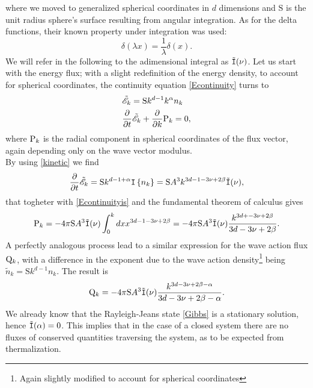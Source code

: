 where we moved to generalized spherical coordinates in $d$ dimensions and $\mathrm{S}$  is the unit radius sphere's surface
resulting from angular integration. 
As for the delta functions, their known property under integration was used:
\begin{equation*}
    \delta(\lambda x) = \frac{1}{\lambda} \delta (x).
\end{equation*}
We will refer in the following to the adimensional integral as $\tilde{\mathtt{I}}(\nu)$. 
Let us start with the energy flux; with a slight redefinition of the energy density,
to account for spherical coordinates, the continuity equation \eqref{Econtinuity} turns to 
\begin{align}
    &\tilde{\mathscr{E}}_k = \mathrm{S}k^{d-1}k^\alpha n_k \\
    &\frac{\partial}{\partial t} \tilde{\mathscr{E}}_k + \frac{\partial}{\partial k}  \mathrm{P}_k = 0,
    \label{Econtinuityis}
\end{align}
where $\mathrm{P}_k$ is the radial component in spherical coordinates of the flux vector,
again depending only on the wave vector modulus.\\
By using \eqref{kinetic} we find
\begin{equation}
    \frac{\partial}{\partial t} \tilde{\mathscr{E}}_k = \mathrm{S} k^{d-1+\alpha} \mathtt{I}\left\{n_k\right\}= \mathrm{S} A^3 k^{3d-1-3\nu +2\beta} \tilde{\mathtt{I}}(\nu),
\end{equation}
that togheter with \eqref{Econtinuityis} and the fundamental theorem of calculus gives 
\begin{equation}
    \mathrm{P}_k = - 4\pi \mathrm{S} A^3 \tilde{\mathtt{I}}(\nu) \int_{0}^{k} dx x^{3d-1-3\nu +2\beta} = - 4\pi \mathrm{S} A^3 \tilde{\mathtt{I}}(\nu) 
    \frac{k^{3d+-3\nu +2\beta}}{3d-3\nu +2\beta}.
    \label{KZP}
\end{equation} 
A perfectly analogous process lead to a similar expression for the wave action flux $\mathrm{Q}_k$, with a difference in the exponent due to the wave action 
density\footnote{Again slightly modified to account for spherical coordinates} being $\tilde{n}_k=\mathrm{S}k^{d-1}n_k$. The result is
\begin{equation}
    \mathrm{Q}_k = - 4\pi \mathrm{S} A^3 \tilde{\mathtt{I}}(\nu) \frac{k^{3d-3\nu +2\beta-\alpha}}{3d-3\nu +2\beta-\alpha}.
    \label{KZQ}
\end{equation}
We already know that the Rayleigh-Jeans state \eqref{Gibbs} is a stationary solution, hence $\tilde{\mathtt{I}}(\alpha) = 0$. This implies that in the case of a closed system there are no
fluxes of conserved quantities traversing the system, as to be expected from thermalization. \\ 
